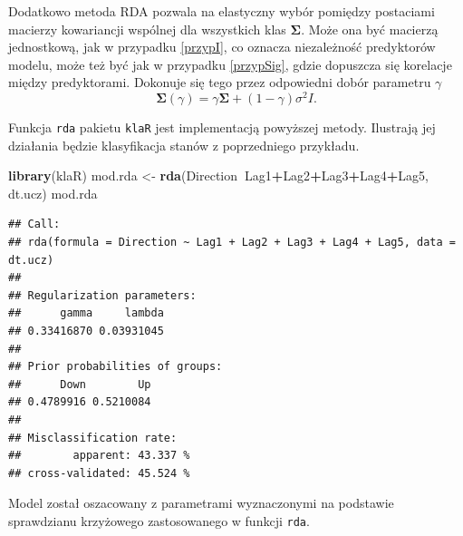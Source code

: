 \documentclass[]{book}
\newenvironment{Shaded}{\begin{snugshade}}{\end{snugshade}}
\newcommand{\DataTypeTok}[1]{\textcolor[rgb]{0.13,0.29,0.53}{#1}}
\newcommand{\KeywordTok}[1]{\textcolor[rgb]{0.13,0.29,0.53}{\textbf{#1}}}
\newcommand{\NormalTok}[1]{#1}
\newcommand{\OperatorTok}[1]{\textcolor[rgb]{0.81,0.36,0.00}{\textbf{#1}}}
\newcommand{\StringTok}[1]{\textcolor[rgb]{0.31,0.60,0.02}{#1}}
\theoremstyle{plain}
\theoremstyle{definition}
\theoremstyle{definition}
\theoremstyle{definition}
\theoremstyle{definition}
\theoremstyle{remark}
\let\BeginKnitrBlock\begin \let\EndKnitrBlock\end
\begin{document}
Dodatkowo metoda RDA pozwala na elastyczny wybór pomiędzy postaciami macierzy kowariancji wspólnej dla wszystkich klas \(\boldsymbol\Sigma\). Może ona być macierzą jednostkową, jak w przypadku \ref{przypI}, co oznacza niezależność predyktorów modelu, może też być jak w przypadku \ref{przypSig}, gdzie dopuszcza się korelacje między predyktorami. Dokonuje się tego przez odpowiedni dobór parametru \(\gamma\)
\begin{equation}
    \boldsymbol \Sigma(\gamma) = \gamma\boldsymbol \Sigma+(1-\gamma)\sigma^2I.
\end{equation}

\BeginKnitrBlock{example}
\protect\hypertarget{exm:rda}{}{\label{exm:rda} }Funkcja \texttt{rda} pakietu \texttt{klaR} jest implementacją powyższej metody. Ilustrają jej działania będzie klasyfikacja stanów z poprzedniego przykładu.
\EndKnitrBlock{example}

\begin{Shaded}
\begin{Highlighting}[]
\KeywordTok{library}\NormalTok{(klaR)}
\NormalTok{mod.rda <-}\StringTok{ }\KeywordTok{rda}\NormalTok{(Direction}\OperatorTok{~}\NormalTok{Lag1}\OperatorTok{+}\NormalTok{Lag2}\OperatorTok{+}\NormalTok{Lag3}\OperatorTok{+}\NormalTok{Lag4}\OperatorTok{+}\NormalTok{Lag5, dt.ucz)}
\NormalTok{mod.rda}
\end{Highlighting}
\end{Shaded}

\begin{verbatim}
## Call: 
## rda(formula = Direction ~ Lag1 + Lag2 + Lag3 + Lag4 + Lag5, data = dt.ucz)
## 
## Regularization parameters: 
##      gamma     lambda 
## 0.33416870 0.03931045 
## 
## Prior probabilities of groups: 
##      Down        Up 
## 0.4789916 0.5210084 
## 
## Misclassification rate: 
##        apparent: 43.337 %
## cross-validated: 45.524 %
\end{verbatim}

Model został oszacowany z parametrami wyznaczonymi na podstawie sprawdzianu krzyżowego zastosowanego w funkcji \texttt{rda}.

\begin{Shaded}
\end{Shaded}
\end{document}

